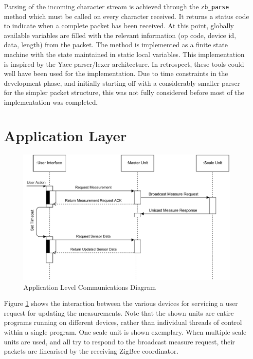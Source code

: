 Parsing of the incoming character stream is achieved through the \texttt{zb\_parse} method which must be called on every character received. It returns a status code to indicate when a complete packet has been received. At this point, globally available variables are filled with the relevant information (op code, device id, data, length) from the packet. The method is implemented as a finite state machine with the state maintained in static local variables. This implementation is inspired by the Yacc parser/lexer architecture\cite{yacc}. In retrospect, these tools could well have been used for the implementation. Due to time constraints in the development phase, and initially starting off with a considerably smaller parser for the simpler packet structure, this was not fully considered before most of the implementation was completed. 

\section{Application Layer}

\begin{figure}
\includegraphics[width=\textwidth]{images/communications-diagram.pdf}
\caption{Application Level Communications Diagram}
\label{communications-diagram}
\end{figure}

Figure \ref{communications-diagram} shows the interaction between the various devices for servicing a user request for updating the measurements. Note that the shown units are entire programs running on different devices, rather than individual threads of control within a single program. One scale unit is shown exemplary. When multiple scale units are used, and all try to respond to the broadcast measure request, their packets are linearised by the receiving ZigBee coordinator.

